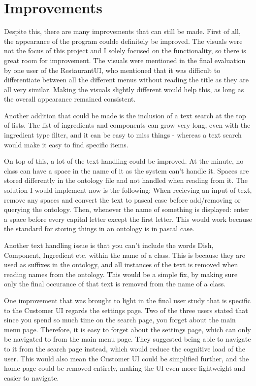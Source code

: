 \section{Improvements}

Despite this, there are many improvements that can still be made. First of all, the appearance of the program coulde definitely be improved. The visuals were not the focus of this project and I solely focused on the functionality, so there is great room for improvement. The visuals were mentioned in the final evaluation by one user of the RestaurantUI, who mentioned that it was difficult to differentiate between all the different menus without reading the title as they are all very similar. Making the visuals slightly different would help this, as long as the overall appearance remained consistent.

Another addition that could be made is the inclusion of a text search at the top of lists. The list of ingredients and components can grow very long, even with the ingredient type filter, and it can be easy to miss things - whereas a text search would make it easy to find specific items.

On top of this, a lot of the text handling could be improved. At the minute, no class can have a space in the name of it as the system can't handle it. Spaces are stored differently in the ontology file and not handled when reading from it. The solution I would implement now is the following: When recieving an input of text, remove any spaces and convert the text to pascal case before add/removing or querying the ontology. Then, whenever the name of something is displayed: enter a space before every capital letter except the first letter. This would work because the standard for storing things in an ontology is in pascal case.

Another text handling issue is that you can't include the words Dish, Component, Ingredient etc. within the name of a class. This is because they are used as suffixes in the ontology, and all instances of the text is removed when reading names from the ontology. This would be a simple fix, by making sure only the final occurance of that text is removed from the name of a class.

One improvement that was brought to light in the final user study that is specific to the Customer UI regards the settings page. Two of the three users stated that since you spend so much time on the search page, you forget about the main menu page. Therefore, it is easy to forget about the settings page, which can only be navigated to from the main menu page. They suggested being able to navigate to it from the search page instead, which would reduce the cognitive load of the user. This would also mean the Customer UI could be simplified further, and the home page could be removed entirely, making the UI even more lightweight and easier to navigate.

